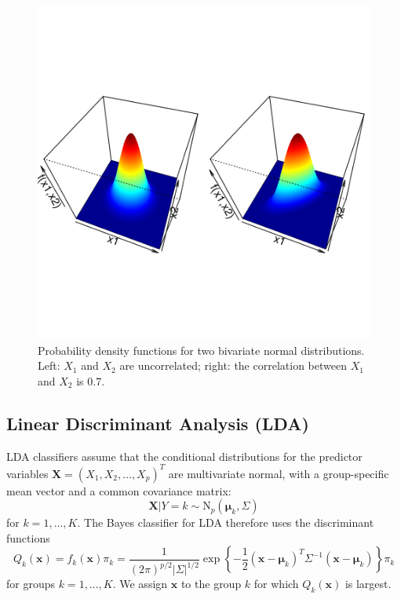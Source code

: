 \documentclass[
]{article}
\begin{document}
\begin{figure}[th]

{\centering \includegraphics{bivariatenormal-1} 

}

\caption{Probability density functions for two bivariate normal distributions. Left: $X_1$ and $X_2$ are uncorrelated; right: the correlation between $X_1$ and $X_2$ is 0.7.}\label{fig:bivariatenormal}
\end{figure}

\hypertarget{subsec:LDA}{%
\subsection{Linear Discriminant Analysis (LDA)}\label{subsec:LDA}}

LDA classifiers assume that the conditional distributions for the
predictor variables \(\boldsymbol{X} = ( X_1, X_2, \ldots, X_p )^T\) are
multivariate normal, with a group-specific mean vector and a common
covariance matrix: \begin{equation*}
\boldsymbol{X} | Y = k \sim \mathrm{N}_p(\boldsymbol{\mu}_k, \Sigma)
\end{equation*} for \(k=1,\ldots,K\). The Bayes classifier for LDA
therefore uses the discriminant functions \begin{equation*}
Q_k(\boldsymbol{x}) = f_k(\boldsymbol{x}) \pi_k = \frac{1}{(2\pi)^{p/2} |\Sigma|^{1/2}} \exp\left\{-\frac{1}{2}\left(\boldsymbol{x} - \boldsymbol{\mu}_k\right)^T \Sigma^{-1} \left(\boldsymbol{x} - \boldsymbol{\mu}_k \right)\right\} \pi_k
\end{equation*} for groups \(k=1,\dots,K\). We assign \(\boldsymbol{x}\)
to the group \(k\) for which \(Q_k(\boldsymbol{x})\) is largest.
\end{document}
